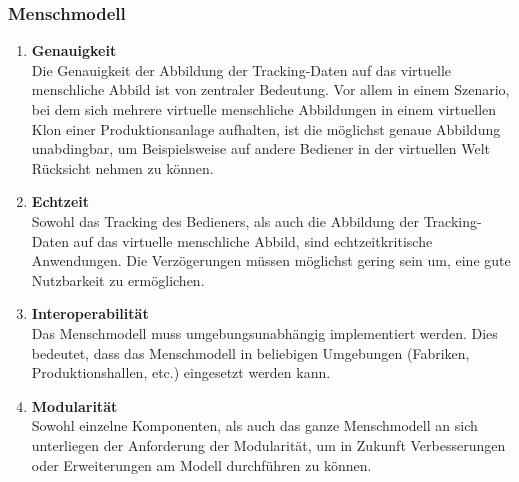 \subsubsection{Menschmodell}\label{sec:AnforderungenMensch}
\begin{enumerate}
	\item \textbf{Genauigkeit} \\
	Die Genauigkeit der Abbildung der Tracking-Daten auf das virtuelle menschliche Abbild ist von zentraler Bedeutung. Vor allem in einem Szenario, bei dem sich mehrere virtuelle menschliche Abbildungen in einem virtuellen Klon einer Produktionsanlage aufhalten, ist die möglichst genaue Abbildung unabdingbar, um Beispielsweise auf andere Bediener in der virtuellen Welt Rücksicht nehmen zu können.
	\item \textbf{Echtzeit} \\
	Sowohl das Tracking des Bedieners, als auch die Abbildung der Tracking-Daten auf das virtuelle menschliche Abbild, sind echtzeitkritische Anwendungen. Die Verzögerungen müssen möglichst gering sein um, eine gute Nutzbarkeit zu ermöglichen.
	\item \textbf{Interoperabilität} \\
	Das Menschmodell muss umgebungsunabhängig implementiert werden. Dies bedeutet, dass das Menschmodell in beliebigen Umgebungen (Fabriken, Produktionshallen, etc.) eingesetzt werden kann.
	\item \textbf{Modularität} \\
	Sowohl einzelne Komponenten, als auch das ganze Menschmodell an sich unterliegen der Anforderung der Modularität, um in Zukunft Verbesserungen oder Erweiterungen am Modell durchführen zu können.
\end{enumerate}

